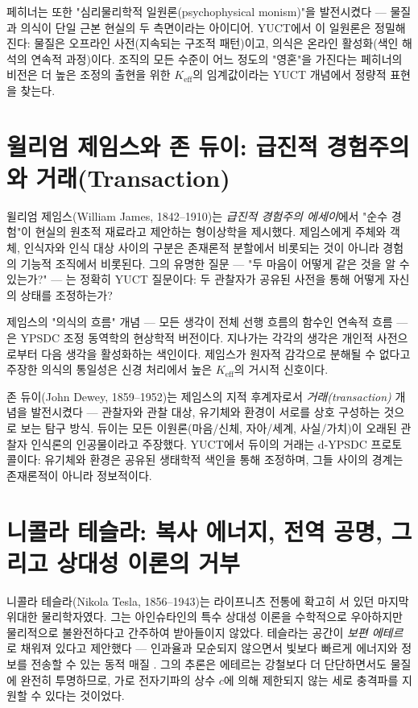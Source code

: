 \documentclass[12pt,a4paper]{article}
\begin{document}
	페히너는 또한 "심리물리학적 일원론(psychophysical monism)"을 발전시켰다 — 물질과 의식이 단일 근본 현실의 두 측면이라는 아이디어. YUCT에서 이 일원론은 정밀해진다: 물질은 오프라인 사전(지속되는 구조적 패턴)이고, 의식은 온라인 활성화(색인 해석의 연속적 과정)이다. 조직의 모든 수준이 어느 정도의 "영혼"을 가진다는 페히너의 비전은 더 높은 조정의 출현을 위한 \(K_{\mathrm{eff}}\)의 임계값이라는 YUCT 개념에서 정량적 표현을 찾는다.
	
	\section{윌리엄 제임스와 존 듀이: 급진적 경험주의와 거래(Transaction)}
	
	윌리엄 제임스(William James, 1842–1910)는 \emph{급진적 경험주의 에세이}에서 "순수 경험"이 현실의 원초적 재료라고 제안하는 형이상학을 제시했다. 제임스에게 주체와 객체, 인식자와 인식 대상 사이의 구분은 존재론적 분할에서 비롯되는 것이 아니라 경험의 기능적 조직에서 비롯된다. 그의 유명한 질문 — "두 마음이 어떻게 같은 것을 알 수 있는가?" — 는 정확히 YUCT 질문이다: 두 관찰자가 공유된 사전을 통해 어떻게 자신의 상태를 조정하는가?
	
	제임스의 "의식의 흐름" 개념 — 모든 생각이 전체 선행 흐름의 함수인 연속적 흐름 — 은 YPSDC 조정 동역학의 현상학적 버전이다. 지나가는 각각의 생각은 개인적 사전으로부터 다음 생각을 활성화하는 색인이다. 제임스가 원자적 감각으로 분해될 수 없다고 주장한 의식의 통일성은 신경 처리에서 높은 \(K_{\mathrm{eff}}\)의 거시적 신호이다.
	
	존 듀이(John Dewey, 1859–1952)는 제임스의 지적 후계자로서 \emph{거래(transaction)} 개념을 발전시켰다 — 관찰자와 관찰 대상, 유기체와 환경이 서로를 상호 구성하는 것으로 보는 탐구 방식. 듀이는 모든 이원론(마음/신체, 자아/세계, 사실/가치)이 오래된 관찰자 인식론의 인공물이라고 주장했다. YUCT에서 듀이의 거래는 d-YPSDC 프로토콜이다: 유기체와 환경은 공유된 생태학적 색인을 통해 조정하며, 그들 사이의 경계는 존재론적이 아니라 정보적이다.
	
	\section{니콜라 테슬라: 복사 에너지, 전역 공명, 그리고 상대성 이론의 거부}
	
	니콜라 테슬라(Nikola Tesla, 1856–1943)는 라이프니츠 전통에 확고히 서 있던 마지막 위대한 물리학자였다. 그는 아인슈타인의 특수 상대성 이론을 수학적으로 우아하지만 물리적으로 불완전하다고 간주하여 받아들이지 않았다. 테슬라는 공간이 \emph{보편 에테르}로 채워져 있다고 제안했다 — 인과율과 모순되지 않으면서 빛보다 빠르게 에너지와 정보를 전송할 수 있는 동적 매질 \cite{Tesla1932}. 그의 추론은 에테르는 강철보다 더 단단하면서도 물질에 완전히 투명하므로, 가로 전자기파의 상수 \(c\)에 의해 제한되지 않는 세로 충격파를 지원할 수 있다는 것이었다.
	
\end{document}
